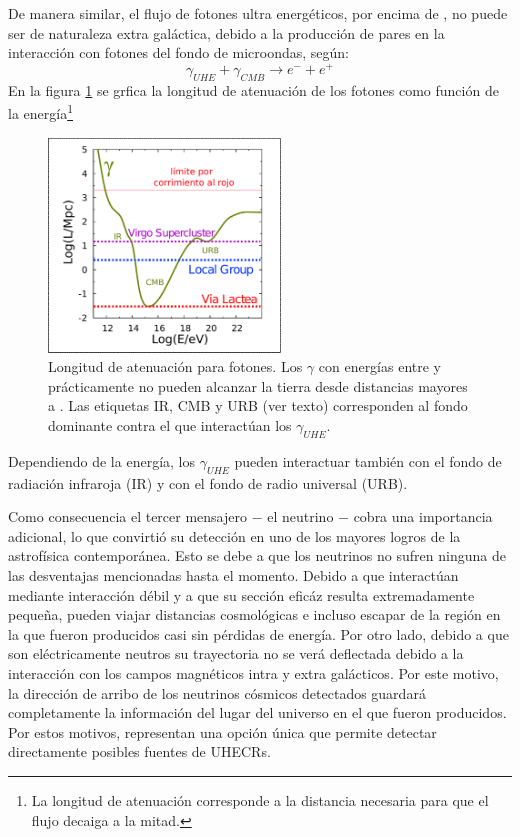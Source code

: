 De manera similar, el flujo de fotones ultra energ\'eticos, por encima de , no puede ser de naturaleza extra gal\'actica, debido a la producci\'on de pares en la interacci\'on con fotones del fondo de microondas, seg\'un\cite{cite:photonInt1,cite:photonInt2}:
%
\begin{equation}
\gamma_{UHE} + \gamma_{CMB} \rightarrow e^- + e^+
\end{equation}
%
En la figura \ref{fig:photProp} se grfica la longitud de atenuaci\'on de los fotones como funci\'on de la energ\'ia\footnote{La longitud de atenuaci\'on corresponde a la distancia necesaria para que el flujo decaiga a la mitad.}
%
\begin{figure}[ht]
	\begin{center}
	\includegraphics[width=0.55\textwidth]{fig/introduccion/photon_propaga_espanol}
	\caption{\label{fig:photProp} Longitud de atenuaci\'on para fotones. Los $\gamma$ con energ\'ias entre  y  pr\'acticamente no pueden alcanzar la tierra desde distancias mayores a . Las etiquetas IR, CMB y URB (ver texto) corresponden al fondo dominante contra el que interact\'uan los $\gamma_{UHE}$.}
	\end{center}
\end{figure}
%
Dependiendo de la energ\'ia, los $\gamma_{UHE}$ pueden interactuar tambi\'en con el fondo de radiaci\'on infraroja (IR)\cite{cite:IR} y con el fondo de radio universal (URB)\cite{cite:URB}.

Como consecuencia el tercer mensajero $-$ el neutrino $-$ cobra una importancia adicional, lo que convirti\'o su detecci\'on en uno de los mayores logros de la astrof\'isica contempor\'anea.
Esto se debe a que los neutrinos no sufren ninguna de las desventajas mencionadas hasta el momento. 
Debido a que interact\'uan mediante interacci\'on d\'ebil y a que su secci\'on efic\'az resulta extremadamente peque\~na, pueden viajar distancias cosmol\'ogicas e incluso escapar de la regi\'on en la que fueron producidos casi sin p\'erdidas de energ\'ia.
Por otro lado, debido a que son el\'ectricamente neutros su trayectoria no se ver\'a deflectada debido a la interacci\'on con los campos magn\'eticos intra y extra gal\'acticos.
Por este motivo, la direcci\'on de arribo de los neutrinos c\'osmicos detectados guardar\'a completamente la informaci\'on del lugar del universo en el que fueron producidos.
Por estos motivos, representan una opci\'on \'unica que permite detectar directamente posibles fuentes de UHECRs.

